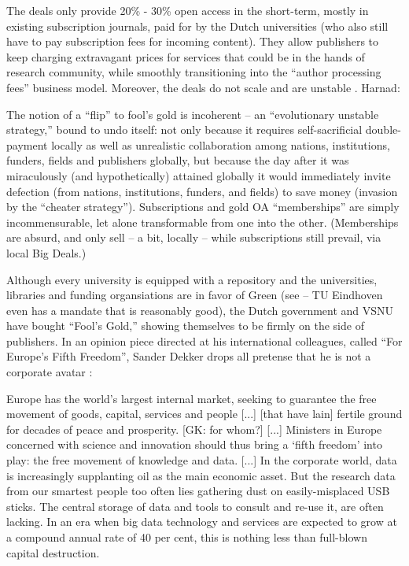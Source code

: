 \documentclass[11pt, openany, oneside, article, a4paper, twocolumn]{memoir}
\begin{document}
The deals \cite{uitgeversdeals} only provide 20\% - 30\% open access in the short-term, mostly in
existing subscription journals, paid for by the Dutch universities
(who also still have to pay subscription fees for incoming content). 
They allow publishers to keep charging
extravagant prices for services that could be in the hands of research
community, while smoothly transitioning into the \enquote{author
processing fees} business model.
Moreover, the deals do not scale and are unstable
\cite{harnad2016evolutionary}. Harnad:
\begin{displayquote}
\begin{small}
The notion of a \enquote{flip} to fool's gold is incoherent -- an
\enquote{evolutionary unstable strategy,} bound to undo itself: not only because it
requires self-sacrificial double-payment locally as well as unrealistic
collaboration among nations, institutions, funders, fields and publishers
globally, but because the day after it was miraculously (and hypothetically)
attained globally it would immediately invite defection (from nations,
institutions, funders, and fields) to save money (invasion by the \enquote{cheater
strategy}). Subscriptions and gold OA \enquote{memberships} are simply incommensurable,
let alone transformable from one into the other. (Memberships are absurd, and
only sell -- a bit, locally -- while subscriptions still prevail, via local Big
Deals.)
\end{small}
\end{displayquote}

Although every university is equipped with a repository \cite{narcis} and the
universities, libraries and funding organsiations are in favor of Green (see
\cite{openaccessnl} -- TU Eindhoven even has a mandate that is reasonably
good), the Dutch government and VSNU have bought \enquote{Fool's Gold,} showing
themselves to be firmly on the side of publishers. In an opinion piece directed
at his international colleagues, called \enquote{For Europe's Fifth Freedom},
Sander Dekker drops all pretense that he is not a corporate avatar
\cite{dekker_fifth_freedom}:

\begin{displayquote} 
\begin{small}
Europe has the world’s largest internal market, seeking to guarantee the free
movement of goods, capital, services and people [...] [that have lain] fertile ground for
decades of peace and prosperity. [GK: for whom?] [...] Ministers in Europe
concerned with science and innovation should thus bring a \enquote*{fifth
freedom} into play: the free movement of knowledge and data. [...] In the
corporate world, data is increasingly supplanting oil as the main economic
asset. But the research data from our smartest people too often lies gathering
dust on easily-misplaced USB sticks. The central storage of data and tools to
consult and re-use it, are often lacking. In an era when big data technology
and services are expected to grow at a compound annual rate of 40 per cent,
this is nothing less than full-blown capital destruction.
\end{small}
\end{displayquote}
\end{document}
